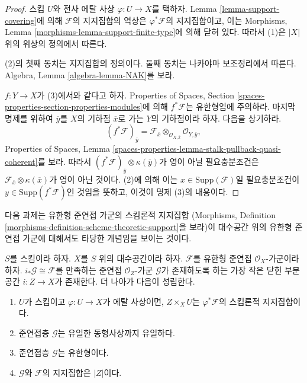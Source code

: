 \begin{proof}
스킴 $U$와 전사 에탈 사상 $\varphi : U \to X$를 택하자.
Lemma \ref{lemma-support-covering}에 의해 $\mathcal{F}$의 지지집합의
역상은 $\varphi^*\mathcal{F}$의 지지집합이고, 이는 Morphisms,
Lemma \ref{morphisms-lemma-support-finite-type}에 의해 닫혀 있다.
따라서 (1)은 $|X|$ 위의 위상의 정의에서 따른다.

\medskip\noindent
(2)의 첫째 동치는 지지집합의 정의이다.
둘째 동치는 나카야마 보조정리에서 따른다. Algebra, Lemma
\ref{algebra-lemma-NAK}를 보라.

\medskip\noindent
$f : Y \to X$가 (3)에서와 같다고 하자.
Properties of Spaces, Section
\ref{spaces-properties-section-properties-modules}에 의해
$f^*\mathcal{F}$는 유한형임에 주의하라.
마지막 명제를 위하여 $\overline{y}$를 $X$의 기하점
$\overline{x}$로 가는 $Y$의 기하점이라 하자. 다음을 상기하라.
$$
(f^*\mathcal{F})_{\overline{y}} =
\mathcal{F}_{\overline{x}} \otimes_{\mathcal{O}_{X, \overline{x}}}
\mathcal{O}_{Y, \overline{y}},
$$
Properties of Spaces, Lemma
\ref{spaces-properties-lemma-stalk-pullback-quasi-coherent}를 보라.
따라서 $(f^*\mathcal{F})_{\overline{y}} \otimes \kappa(\overline{y})$가
영이 아닐 필요충분조건은
$\mathcal{F}_{\overline{x}} \otimes \kappa(\overline{x})$가
영이 아닌 것이다. (2)에 의해 이는
$x \in \text{Supp}(\mathcal{F})$일 필요충분조건이
$y \in \text{Supp}(f^*\mathcal{F})$인 것임을 뜻하고,
이것이 명제 (3)의 내용이다.
\end{proof}

\noindent
다음 과제는 유한형 준연접 가군의 스킴론적 지지집합
(Morphisms, Definition
\ref{morphisms-definition-scheme-theoretic-support}을 보라)이
대수공간 위의 유한형 준연접 가군에 대해서도 타당한 개념임을
보이는 것이다.

\begin{lemma}
\label{lemma-scheme-theoretic-support}
$S$를 스킴이라 하자. $X$를 $S$ 위의 대수공간이라 하자.
$\mathcal{F}$를 유한형 준연접 $\mathcal{O}_X$-가군이라 하자.
$i_*\mathcal{G} \cong \mathcal{F}$를 만족하는 준연접
$\mathcal{O}_Z$-가군 $\mathcal{G}$가 존재하도록 하는 가장 작은
닫힌 부분공간 $i : Z \to X$가 존재한다. 더 나아가 다음이 성립한다.
\begin{enumerate}
\item $U$가 스킴이고 $\varphi : U \to X$가 에탈 사상이면,
$Z \times_X U$는 $\varphi^*\mathcal{F}$의 스킴론적 지지집합이다.
\item 준연접층 $\mathcal{G}$는 유일한 동형사상까지 유일하다.
\item 준연접층 $\mathcal{G}$는 유한형이다.
\item $\mathcal{G}$와 $\mathcal{F}$의 지지집합은 $|Z|$이다.
\end{enumerate}
\end{lemma}

